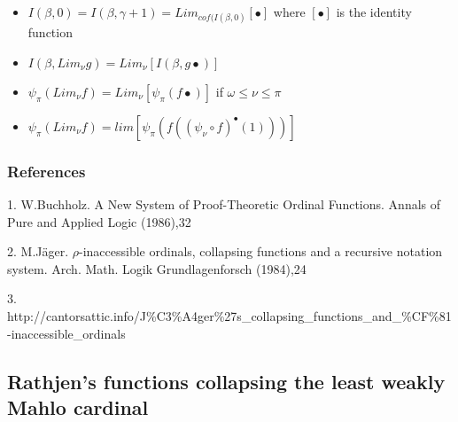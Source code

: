 \documentclass[10pt]{article}
\begin{document}
\begin{itemize}
\bigskip

\item \( I(\beta,0) = I(\beta,\gamma+1) = Lim_{cof(I(\beta,0)} [\bullet] \) where \( [\bullet] \) is the identity function
\item \( I(\beta,Lim_\nu g) = Lim_\nu [I(\beta,g \bullet)] \)
\item \( \psi_\pi(Lim_\nu f) = Lim_\nu [\psi_\pi(f \bullet)] \) if \( \omega \le \nu \le \pi \)
\begin{comment}
\item \( \psi_\pi(Lim_\nu f) = lim [\psi_\pi(f (g \bullet)] \) with \( g(0) = 1 \) and \( g (n+1) = \psi_\nu(f(g(n))) \) if \( \nu \ge \pi \)
\end{comment}
\item \( \psi_\pi(Lim_\nu f) = lim [ \psi_\pi(f((\psi_\nu \circ f)^\bullet(1)))] \)

\end{itemize}

\begin{comment}

\subsubsection{See also}

Other ordinal collapsing functions:

[[Madore's \(\psi\) function]]

[[Buchholz's \(\psi\) functions]]

[[User blog:Denis Maksudov/Ordinal functions collapsing the least weakly Mahlo cardinal; a system of fundamental sequences|collapsing functions based on a weakly Mahlo cardinal]]

\end{comment}

\subsubsection{References}

1. W.Buchholz. A New System of Proof-Theoretic Ordinal Functions. Annals of Pure and Applied Logic (1986),32

2. M.Jäger. \(\rho\)-inaccessible ordinals, collapsing functions and a recursive notation system. Arch. Math. Logik Grundlagenforsch (1984),24

3. http://cantorsattic.info/J\%C3\%A4ger\%27s\_collapsing\_functions\_and\_\%CF\%81-inaccessible\_ordinals


\subsection{Rathjen's functions collapsing the least weakly Mahlo cardinal}
\end{document}
